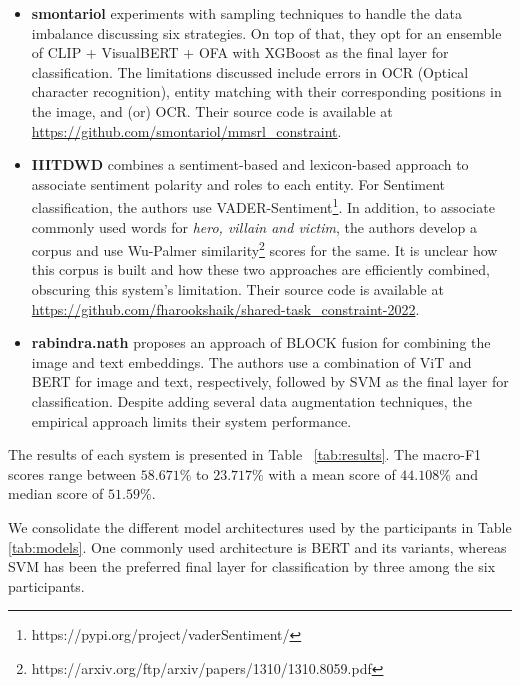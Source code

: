 \documentclass[11pt]{article}
\begin{document}
\begin{itemize}
    \item \textbf{smontariol} experiments with sampling techniques to handle the data imbalance discussing six strategies. On top of that, they opt for an ensemble of CLIP \citep{radford_learning_2021} + VisualBERT + OFA \citep{cai_once-for-all_2020} with XGBoost as the final layer for classification. The limitations discussed include errors in OCR (Optical character recognition), entity matching with their corresponding positions in the image, and (or) OCR. Their source code is available at \url{https://github.com/smontariol/mmsrl_constraint}.
    \item \textbf{IIITDWD} combines a sentiment-based and lexicon-based approach to associate sentiment polarity and roles to each entity. For Sentiment classification, the authors use VADER-Sentiment\footnote{https://pypi.org/project/vaderSentiment/}. In addition, to associate commonly used words for \emph{hero, villain and victim}, the authors develop a corpus and use Wu-Palmer similarity\footnote{https://arxiv.org/ftp/arxiv/papers/1310/1310.8059.pdf} scores for the same. It is unclear how this corpus is built and how these two approaches are efficiently combined, obscuring this system's limitation. Their source code is available at  \url{https://github.com/fharookshaik/shared-task_constraint-2022}.
    \item \textbf{rabindra.nath} proposes an approach of BLOCK fusion \citep{ben-younes_block_2019} for combining the image and text embeddings. The authors use a combination of ViT \citep{bobicev-sokolova-2017-inter} and BERT \citep{devlin_bert_2019} for image and text, respectively, followed by SVM as the final layer for classification. Despite adding several data augmentation techniques, the empirical approach limits their system performance. 
\end{itemize}

The results of each system is presented in Table ~\ref{tab:results}. The macro-F1 scores range between $58.671\%$ to $23.717\%$ with a mean score of $44.108\%$ and median score of $51.59\%$.\par
We consolidate the different model architectures used by the participants in Table \ref{tab:models}. One commonly used architecture is BERT and its variants, whereas SVM has been the preferred final layer for classification by three among the six participants. 
\end{document}
